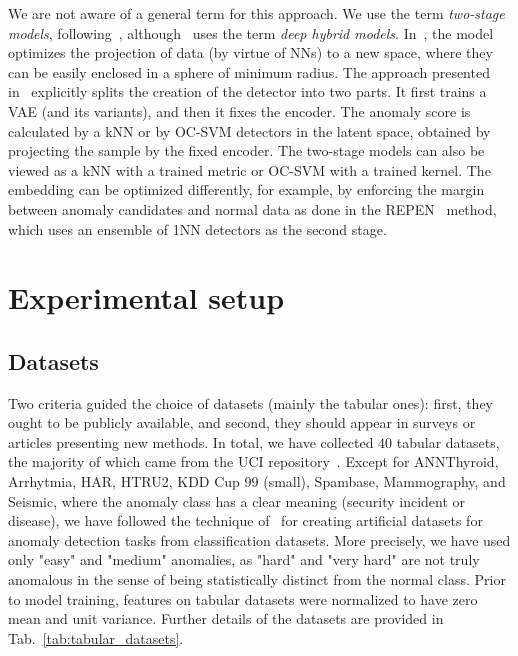 We are not aware of a general term for this approach. We use the term \textit{two-stage models}, following~\cite{dai2019diagnosing}, although~\cite{chalapathy2019deep} uses the term \textit{deep hybrid models}. In~\cite{ruff2018deep}, the model optimizes the projection of data (by virtue of NNs) to a new space, where they can be easily enclosed in a sphere of minimum radius. The approach presented in~\cite{vskvara2020detection, yaoUnsupervisedAnomalyDetection2019} explicitly splits the creation of the detector into two parts. It first trains a VAE (and its variants), and then it fixes the encoder. The anomaly score is calculated by a kNN \cite{vskvara2020detection} or by OC-SVM \cite{yaoUnsupervisedAnomalyDetection2019} detectors in the latent space, obtained by projecting the sample by the fixed encoder. The two-stage models can also be viewed as a kNN with a trained metric or OC-SVM with a trained kernel. The embedding can be optimized differently, for example, by enforcing the margin between anomaly candidates and normal data as done in the REPEN~\cite{pangLearningRepresentationsUltrahighdimensional2018} method, which uses an ensemble of 1NN detectors as the second stage.

\section{Experimental setup}
\label{sec:experimentalsetup}
\subsection{Datasets}
\label{sec:datasets}
Two criteria guided the choice of datasets (mainly the tabular ones): first, they ought to be publicly available, and second, they should appear in surveys or articles presenting new methods.  In total, we have collected $40$ tabular datasets, the majority of which came from the UCI repository~\cite{Dua:2019}. Except for ANNThyroid, Arrhytmia, HAR, HTRU2, KDD Cup 99 (small), Spambase, Mammography, and Seismic, where the anomaly class has a clear meaning (security incident or disease), we have followed the technique of~\cite{emmott2013systematic} for creating artificial datasets for anomaly detection tasks from classification datasets. More precisely, we have used only "easy" and "medium" anomalies, as "hard" and "very hard" are not truly anomalous in the sense of being statistically distinct from the normal class. Prior to model training, features on tabular datasets were normalized to have zero mean and unit variance. Further details of the datasets are provided in Tab.~\ref{tab:tabular_datasets}.

